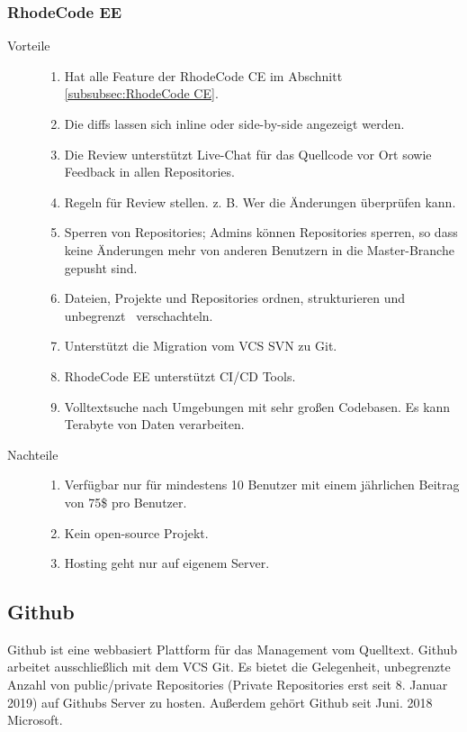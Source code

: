 \subsubsection{RhodeCode EE}
\label{subsubsec:RhodeCode EE}

\begin{description}
	\item [Vorteile] \hfill
		\begin{enumerate}
			\item Hat alle Feature der RhodeCode CE im Abschnitt \ref{subsubsec:RhodeCode CE}.
			\item Die diffs lassen sich inline oder side-by-side angezeigt werden. 
			\item Die Review unterstützt Live-Chat für das Quellcode vor Ort sowie Feedback in allen Repositories.
			\item Regeln für Review stellen. z. B. Wer die Änderungen überprüfen kann.
			\item Sperren von Repositories; Admins können Repositories sperren, so dass keine Änderungen mehr von anderen Benutzern in die Master-Branche gepusht sind.
			\item Dateien, Projekte und Repositories ordnen, strukturieren und unbegrenzt \, verschachteln.
			\item Unterstützt die Migration vom \ac{VCS} SVN zu Git.
			\item RhodeCode EE unterstützt \ac{CI}/\ac{CD} Tools.
			\item Volltextsuche nach Umgebungen mit sehr großen Codebasen. Es kann Terabyte von Daten verarbeiten.
		\end{enumerate}
	\item [Nachteile] \hfill
		\begin{enumerate}
			\item Verfügbar nur für mindestens 10 Benutzer mit einem jährlichen Beitrag von 75\$ pro Benutzer.
			\item Kein open-source Projekt.
			\item Hosting geht nur auf eigenem Server.
		\end{enumerate}
\end{description}


\subsection{Github}
\label{Github}

Github ist eine webbasiert Plattform für das Management vom Quelltext. Github arbeitet ausschließlich mit dem \ac{VCS} Git. Es bietet die Gelegenheit, unbegrenzte Anzahl von public/private Repositories (Private Repositories erst seit 8. Januar 2019) auf Githubs Server zu hosten. Außerdem gehört Github seit Juni. 2018 Microsoft.

